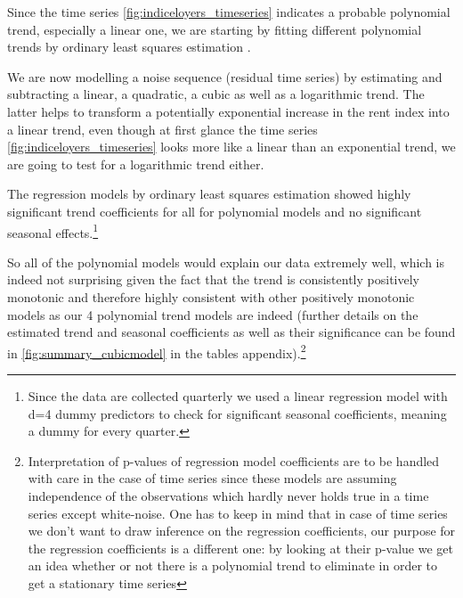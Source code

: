 \documentclass[11pt,a4paper]{article}
\begin{document}
Since the time series \ref{fig:indiceloyers_timeseries} indicates a probable polynomial trend, especially a linear one, we are starting by fitting different polynomial trends by ordinary least squares estimation \cite[p.~11]{htf09}.

We are now modelling a noise sequence (residual time series) by estimating and subtracting a linear, a quadratic, a cubic as well as a logarithmic trend.
The latter  helps to transform a potentially exponential increase in the rent index into a linear trend, even though at first glance the time series \cref{fig:indiceloyers_timeseries} looks more like a linear than an exponential trend, we are going to test for a logarithmic trend either.

The regression models by ordinary least squares estimation \cite[p.~11]{htf09} showed highly significant trend coefficients for all for polynomial models and no significant seasonal effects.\footnote{
    Since the data are collected quarterly we used a linear regression model with d=4 dummy predictors to check for significant seasonal coefficients, meaning a dummy for every quarter.
}

So all of the polynomial models would explain our data extremely well, which is indeed not surprising given the fact that the trend is consistently positively monotonic and therefore highly consistent with other positively monotonic models as our 4 polynomial trend models are indeed (further details on the estimated trend and seasonal coefficients as well as their significance can be found in \cref{fig:summary_cubicmodel} in the tables appendix).\footnote{
    Interpretation of p-values of regression model coefficients are to be handled with care in the case of time series since these models are assuming independence of the observations which hardly never holds true in a time series except white-noise.
    One has to keep in mind that in case of time series we don't want to draw inference on the regression coefficients, our purpose for the regression coefficients is a different one: by looking at their p-value we get an idea whether or not there is a polynomial trend to eliminate in order to get a stationary time series
}
\end{document}
